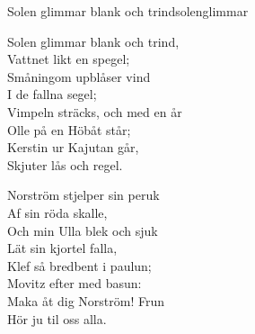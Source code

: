 \begin{song}{Solen glimmar blank och trind}{solenglimmar}

\begin{vers}
Solen glimmar blank och trind,\\
Vattnet likt en spegel;\\
Småningom upblåser vind\\
I de fallna segel;\\
Vimpeln sträcks, och med en år\\
Olle på en Höbåt står;\\
Kerstin ur Kajutan går,\\
Skjuter lås och regel.\\
\end{vers}
\begin{vers}
Norström stjelper sin peruk\\
Af sin röda skalle,\\
Och min Ulla blek och sjuk\\
Lät sin kjortel falla,\\
Klef så bredbent i paulun;\\
Movitz efter med basun:\\
Maka åt dig Norström! Frun\\
Hör ju til oss alla.\\
\end{vers}
\end{song}
